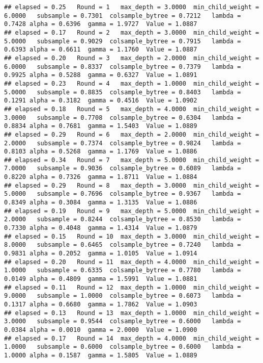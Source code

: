 \documentclass[]{article}
\begin{document}
\begin{verbatim}
## elapsed = 0.25   Round = 1   max_depth = 3.0000  min_child_weight = 6.0000   subsample = 0.7301  colsample_bytree = 0.7212   lambda = 0.7428 alpha = 0.6396  gamma = 1.9727  Value = 1.0887 
## elapsed = 0.17   Round = 2   max_depth = 3.0000  min_child_weight = 5.0000   subsample = 0.9029  colsample_bytree = 0.7915   lambda = 0.6393 alpha = 0.6611  gamma = 1.1760  Value = 1.0887 
## elapsed = 0.20   Round = 3   max_depth = 2.0000  min_child_weight = 6.0000   subsample = 0.8337  colsample_bytree = 0.7379   lambda = 0.9925 alpha = 0.5288  gamma = 0.6327  Value = 1.0891 
## elapsed = 0.23   Round = 4   max_depth = 1.0000  min_child_weight = 5.0000   subsample = 0.8835  colsample_bytree = 0.8403   lambda = 0.1291 alpha = 0.3182  gamma = 0.4516  Value = 1.0902 
## elapsed = 0.18   Round = 5   max_depth = 4.0000  min_child_weight = 3.0000   subsample = 0.7708  colsample_bytree = 0.6304   lambda = 0.8834 alpha = 0.7681  gamma = 1.5403  Value = 1.0889 
## elapsed = 0.29   Round = 6   max_depth = 2.0000  min_child_weight = 2.0000   subsample = 0.7374  colsample_bytree = 0.9824   lambda = 0.8103 alpha = 0.5268  gamma = 1.1769  Value = 1.0886 
## elapsed = 0.34   Round = 7   max_depth = 5.0000  min_child_weight = 7.0000   subsample = 0.9036  colsample_bytree = 0.6089   lambda = 0.8220 alpha = 0.7326  gamma = 1.8711  Value = 1.0884 
## elapsed = 0.29   Round = 8   max_depth = 3.0000  min_child_weight = 5.0000   subsample = 0.7696  colsample_bytree = 0.9367   lambda = 0.8349 alpha = 0.3084  gamma = 1.3135  Value = 1.0886 
## elapsed = 0.19   Round = 9   max_depth = 5.0000  min_child_weight = 2.0000   subsample = 0.8244  colsample_bytree = 0.8530   lambda = 0.7330 alpha = 0.4048  gamma = 1.4314  Value = 1.0879 
## elapsed = 0.15   Round = 10  max_depth = 3.0000  min_child_weight = 8.0000   subsample = 0.6465  colsample_bytree = 0.7240   lambda = 0.9831 alpha = 0.2052  gamma = 1.0105  Value = 1.0914 
## elapsed = 0.20   Round = 11  max_depth = 4.0000  min_child_weight = 1.0000   subsample = 0.6335  colsample_bytree = 0.7780   lambda = 0.0149 alpha = 0.4809  gamma = 1.5991  Value = 1.0881 
## elapsed = 0.11   Round = 12  max_depth = 1.0000  min_child_weight = 9.0000   subsample = 1.0000  colsample_bytree = 0.6073   lambda = 0.1317 alpha = 0.6680  gamma = 1.7862  Value = 1.0903 
## elapsed = 0.13   Round = 13  max_depth = 1.0000  min_child_weight = 3.0000   subsample = 0.9544  colsample_bytree = 0.6000   lambda = 0.0384 alpha = 0.0010  gamma = 2.0000  Value = 1.0900 
## elapsed = 0.17   Round = 14  max_depth = 4.0000  min_child_weight = 1.0000   subsample = 0.6000  colsample_bytree = 0.6000   lambda = 1.0000 alpha = 0.1587  gamma = 1.5805  Value = 1.0889 

\end{verbatim}
\end{document}
